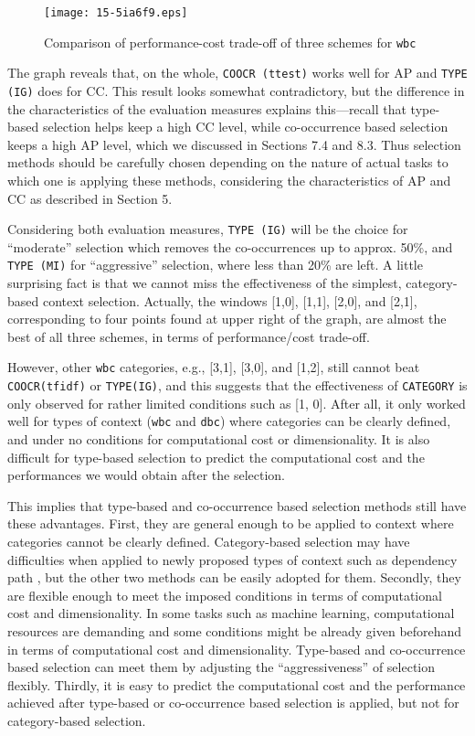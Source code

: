 \documentclass[english]{jnlp_1.4}
\begin{document}
\begin{figure}[t]
\begin{center}
\texttt{[image: 15-5ia6f9.eps]}
\end{center}
\caption{Comparison of performance-cost trade-off of three schemes for {\tt wbc}}
\label{fig_cocrres2_wbc}
\end{figure}


The graph reveals that, on the whole, {\tt COOCR (ttest)} works well
for AP and {\tt TYPE (IG)} does for CC. This result looks somewhat
contradictory, but the difference in the characteristics of the
evaluation measures explains this---recall that type-based selection
helps keep a high CC level, while co-occurrence based selection keeps
a high AP level, which we discussed in Sections 7.4 and 8.3. Thus
selection methods should be carefully chosen depending on the nature
of actual tasks to which one is applying these methods, considering
the characteristics of AP and CC as described in Section 5.

Considering both evaluation measures, {\tt TYPE (IG)} will be the
choice for ``moderate'' selection which removes the co-occurrences up
to approx. 50\%, and {\tt TYPE (MI)} for ``aggressive'' selection,
where less than 20\% are left. A little surprising fact is that we
cannot miss the effectiveness of the simplest, category-based context
selection. Actually, the windows [1,0], [1,1], [2,0], and [2,1],
corresponding to four points found at upper right of the graph, are
almost the best of all three schemes, in terms of performance/cost
trade-off.

However, other {\tt wbc} categories, e.g., [3,1], [3,0], and [1,2],
still cannot beat {\tt COOCR(tfidf)} or {\tt TYPE(IG)}, and this
suggests that the effectiveness of {\tt CATEGORY} is only observed for
rather limited conditions such as [1, 0]. After all, it only worked
well for types of context ({\tt wbc} and {\tt dbc}) where categories
can be clearly defined, and under no conditions for computational cost
or dimensionality. It is also difficult for type-based selection to
predict the computational cost and the performances we would obtain
after the selection.

This implies that type-based and co-occurrence based selection methods
still have these advantages. First, they are general enough to be
applied to context where categories cannot be clearly
defined. Category-based selection may have difficulties when applied
to newly proposed types of context such as dependency path
{\cite{Lin:01}}, but the other two methods can be easily adopted for
them. Secondly, they are flexible enough to meet the imposed
conditions in terms of computational cost and dimensionality. In some
tasks such as machine learning, computational resources are demanding
and some conditions might be already given beforehand in terms of
computational cost and dimensionality. Type-based and co-occurrence
based selection can meet them by adjusting the ``aggressiveness'' of
selection flexibly. Thirdly, it is easy to predict the computational
cost and the performance achieved after type-based or co-occurrence
based selection is applied, but not for category-based selection.
\end{document}
